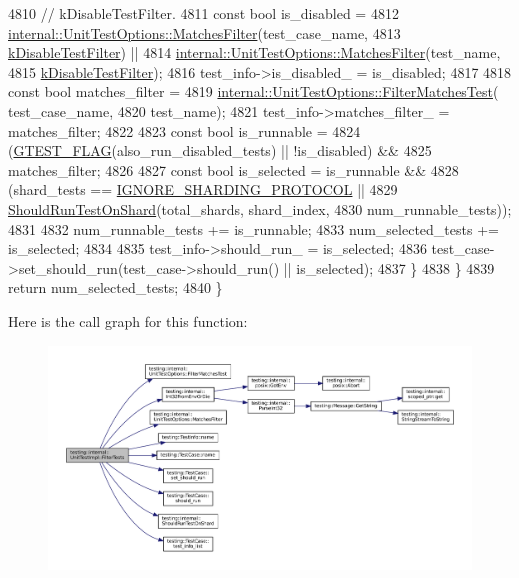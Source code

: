 \begin{DoxyCode}
4810       \textcolor{comment}{// kDisableTestFilter.}
4811       \textcolor{keyword}{const} \textcolor{keywordtype}{bool} is\_disabled =
4812           \hyperlink{classtesting_1_1internal_1_1UnitTestOptions_a67fc0adaffbb8d320b92e42e05017e4e}{internal::UnitTestOptions::MatchesFilter}(test\_case\_name,
4813                                                    \hyperlink{namespacetesting_a0a2a3239fb038e7ce83195d89941872d}{kDisableTestFilter}) ||
4814           \hyperlink{classtesting_1_1internal_1_1UnitTestOptions_a67fc0adaffbb8d320b92e42e05017e4e}{internal::UnitTestOptions::MatchesFilter}(test\_name,
4815                                                    \hyperlink{namespacetesting_a0a2a3239fb038e7ce83195d89941872d}{kDisableTestFilter});
4816       test\_info->is\_disabled\_ = is\_disabled;
4817 
4818       \textcolor{keyword}{const} \textcolor{keywordtype}{bool} matches\_filter =
4819           \hyperlink{classtesting_1_1internal_1_1UnitTestOptions_a9975b59cece94874b303421697e3bca6}{internal::UnitTestOptions::FilterMatchesTest}(
      test\_case\_name,
4820                                                        test\_name);
4821       test\_info->matches\_filter\_ = matches\_filter;
4822 
4823       \textcolor{keyword}{const} \textcolor{keywordtype}{bool} is\_runnable =
4824           (\hyperlink{gtest-port_8h_a828f4e34a1c4b510da50ec1563e3562a}{GTEST\_FLAG}(also\_run\_disabled\_tests) || !is\_disabled) &&
4825           matches\_filter;
4826 
4827       \textcolor{keyword}{const} \textcolor{keywordtype}{bool} is\_selected = is\_runnable &&
4828           (shard\_tests == \hyperlink{classtesting_1_1internal_1_1UnitTestImpl_acc5ffd3f9bc2e87bb3dba4218f58af43a68bd0b7e6a7bead14c93d1a42144095a}{IGNORE\_SHARDING\_PROTOCOL} ||
4829            \hyperlink{namespacetesting_1_1internal_a437bd89f5bc532778d7467600e210395}{ShouldRunTestOnShard}(total\_shards, shard\_index,
4830                                 num\_runnable\_tests));
4831 
4832       num\_runnable\_tests += is\_runnable;
4833       num\_selected\_tests += is\_selected;
4834 
4835       test\_info->should\_run\_ = is\_selected;
4836       test\_case->set\_should\_run(test\_case->should\_run() || is\_selected);
4837     \}
4838   \}
4839   \textcolor{keywordflow}{return} num\_selected\_tests;
4840 \}
\end{DoxyCode}
Here is the call graph for this function\+:
\nopagebreak
\begin{figure}[H]
\begin{center}
\leavevmode
\includegraphics[width=350pt]{classtesting_1_1internal_1_1UnitTestImpl_abd47e447f0c2557ed528db0350671bed_cgraph}
\end{center}
\end{figure}
